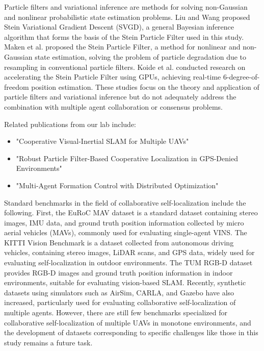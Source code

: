 \documentclass[a4paper,fleqn,10pt,twocolumn]{SICE_ISCS}
\begin{document}
Particle filters and variational inference are methods for solving non-Gaussian and nonlinear probabilistic state estimation problems. Liu and Wang \cite{Liu2016} proposed Stein Variational Gradient Descent (SVGD), a general Bayesian inference algorithm that forms the basis of the Stein Particle Filter used in this study. Maken et al. \cite{Maken2021} proposed the Stein Particle Filter, a method for nonlinear and non-Gaussian state estimation, solving the problem of particle degradation due to resampling in conventional particle filters. Koide et al. \cite{Koide2021} conducted research on accelerating the Stein Particle Filter using GPUs, achieving real-time 6-degree-of-freedom position estimation. These studies focus on the theory and application of particle filters and variational inference but do not adequately address the combination with multiple agent collaboration or consensus problems.

Related publications from our lab include:
\begin{itemize}
\item "Cooperative Visual-Inertial SLAM for Multiple UAVs"
\item "Robust Particle Filter-Based Cooperative Localization in GPS-Denied Environments"
\item "Multi-Agent Formation Control with Distributed Optimization"
\end{itemize}

Standard benchmarks in the field of collaborative self-localization include the following. First, the EuRoC MAV dataset is a standard dataset containing stereo images, IMU data, and ground truth position information collected by micro aerial vehicles (MAVs), commonly used for evaluating single-agent VINS. The KITTI Vision Benchmark is a dataset collected from autonomous driving vehicles, containing stereo images, LiDAR scans, and GPS data, widely used for evaluating self-localization in outdoor environments. The TUM RGB-D dataset provides RGB-D images and ground truth position information in indoor environments, suitable for evaluating vision-based SLAM. Recently, synthetic datasets using simulators such as AirSim, CARLA, and Gazebo have also increased, particularly used for evaluating collaborative self-localization of multiple agents. However, there are still few benchmarks specialized for collaborative self-localization of multiple UAVs in monotone environments, and the development of datasets corresponding to specific challenges like those in this study remains a future task.
\end{document}
